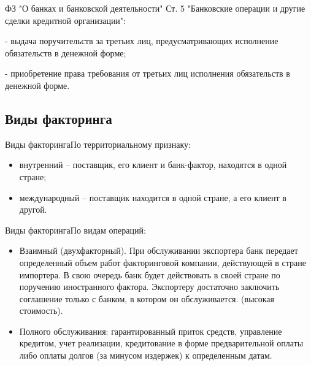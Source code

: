 \documentclass[_Banking_p3.tex]{subfiles}
\begin{document}
\begin{frame}{ФЗ "О банках и банковской деятельности"}
Ст. 5 "Банковские операции и другие сделки кредитной организации":

- выдача поручительств за третьих лиц, предусматривающих исполнение обязательств в денежной форме;

- приобретение права требования от третьих лиц исполнения обязательств в денежной форме.

\end{frame}

\subsection{Виды факторинга}
\begin{frame} {Виды факторинга}{По территориальному признаку:}
\begin{itemize}[<+->]
\item
внутренний – поставщик, его клиент и банк-фактор, находятся в одной стране;

\item
международный – поставщик находится в одной стране, а его клиент в другой.

\end{itemize}

\end{frame}
\begin{frame}[ allowframebreaks ] {Виды факторинга}{По видам операций:}
\begin{itemize}
\item
Взаимный (двухфакторный). При обслуживании экспортера банк передает определенный объем работ факторинговой компании, действующей в стране импортера. В свою очередь банк будет действовать в своей стране по поручению иностранного фактора. Экспортеру достаточно заключить соглашение только с банком, в котором он обслуживается. (высокая стоимость).

\pagebreak
\item
Полного обслуживания: гарантированный приток средств, управление кредитом, учет реализации, кредитование в форме предварительной оплаты либо оплаты долгов (за минусом издержек) к определенным датам.

\end{itemize}

\end{frame}
\end{document}
